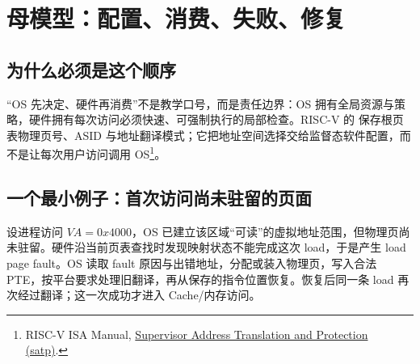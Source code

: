 \documentclass[UTF8,fontset=none,11pt,a4paper]{ctexart}
\begin{document}
\section{母模型：配置、消费、失败、修复}
\begin{center}
\end{center}

\subsection{为什么必须是这个顺序}
“OS 先决定、硬件再消费”不是教学口号，而是责任边界：OS 拥有全局资源与策略，硬件拥有每次访问必须快速、可强制执行的局部检查。RISC-V 的  保存根页表物理页号、ASID 与地址翻译模式；它把地址空间选择交给监督态软件配置，而不是让每次用户访问调用 OS\footnote{RISC-V ISA Manual, \href{https://github.com/riscv/riscv-isa-manual/blob/main/src/priv/supervisor.adoc}{Supervisor Address Translation and Protection (satp)}.}。

\subsection{一个最小例子：首次访问尚未驻留的页面}
设进程访问 \(VA=0x4000\)，OS 已建立该区域“可读”的虚拟地址范围，但物理页尚未驻留。硬件沿当前页表查找时发现映射状态不能完成这次 load，于是产生 load page fault。OS 读取 fault 原因与出错地址，分配或装入物理页，写入合法 PTE，按平台要求处理旧翻译，再从保存的指令位置恢复。恢复后同一条 load 再次经过翻译；这一次成功才进入 Cache/内存访问。
\end{document}
